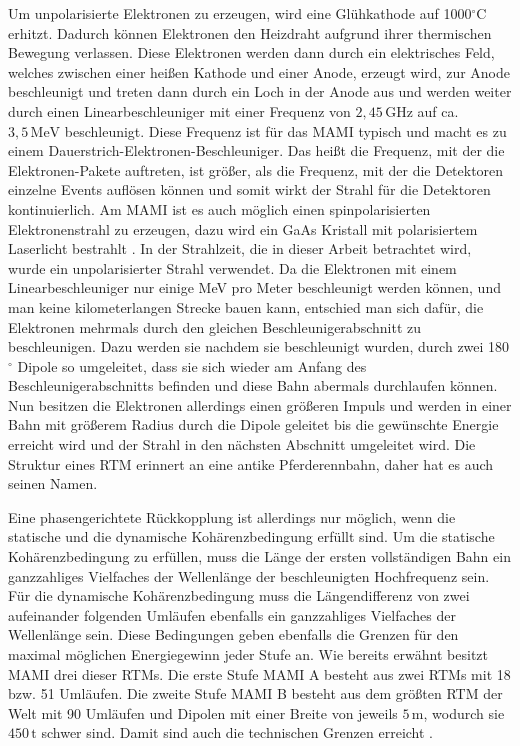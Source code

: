 \documentclass[a4paper,11pt,oneside,final,german,openbib,pdftex]{scrbook}
\begin{document}
{Um unpolarisierte Elektronen zu erzeugen, wird eine Glühkathode auf 1000$^{\circ}$C erhitzt. Dadurch können Elektronen den Heizdraht aufgrund ihrer thermischen Bewegung verlassen. Diese Elektronen werden dann durch ein elektrisches Feld, welches zwischen einer heißen Kathode und einer Anode, erzeugt wird, zur Anode beschleunigt und treten dann durch ein Loch in der Anode aus und werden weiter durch einen Linearbeschleuniger mit einer Frequenz von $2,45\, \text{GHz}$ auf ca. $3,5\, \text{MeV}$ beschleunigt. Diese Frequenz ist für das MAMI typisch und macht es zu einem Dauerstrich-Elektronen-Beschleuniger. Das heißt die Frequenz, mit der die Elektronen-Pakete auftreten, ist größer, als die Frequenz, mit der die Detektoren einzelne Events auflösen können und somit wirkt der Strahl für die Detektoren kontinuierlich.
Am MAMI ist es auch m\"oglich einen spinpolarisierten Elektronenstrahl zu erzeugen, dazu wird ein GaAs Kristall mit polarisiertem Laserlicht bestrahlt \cite{Un08}. 
In der Strahlzeit, die in dieser Arbeit betrachtet wird, wurde ein unpolarisierter Strahl verwendet.
\newline
Da die Elektronen mit einem Linearbeschleuniger nur einige MeV pro Meter beschleunigt werden k\"onnen, und man keine kilometerlangen Strecke bauen kann, entschied man sich daf\"ur, die Elektronen mehrmals durch den gleichen Beschleunigerabschnitt zu beschleunigen. Dazu werden sie nachdem sie beschleunigt wurden, durch zwei 180$^{\circ}$ Dipole so umgeleitet, dass sie sich wieder am Anfang des Beschleunigerabschnitts befinden und diese Bahn abermals durchlaufen können. Nun besitzen die Elektronen allerdings einen gr\"o{\ss}eren Impuls und werden in einer Bahn mit gr\"o{\ss}erem Radius durch die Dipole geleitet bis die gew\"unschte Energie erreicht wird und der Strahl in den n\"achsten Abschnitt umgeleitet wird. Die Struktur eines RTM erinnert an eine antike Pferderennbahn, daher hat es auch seinen Namen.

 Eine phasengerichtete R\"uckkopplung ist allerdings nur m\"oglich, wenn die statische und die dynamische Koh\"arenzbedingung erf\"ullt sind. Um die statische Koh\"arenzbedingung zu erf\"ullen, muss die L\"ange der ersten vollst\"andigen Bahn ein ganzzahliges Vielfaches der Wellenl\"ange der beschleunigten Hochfrequenz sein. F\"ur die dynamische Koh\"arenzbedingung muss die L\"angendifferenz von zwei aufeinander folgenden Uml\"aufen ebenfalls ein ganzzahliges Vielfaches der Wellenl\"ange sein\cite{Un08}. 
  Diese Bedingungen geben ebenfalls die Grenzen f\"ur den maximal m\"oglichen Energiegewinn jeder Stufe an. 
\newline
Wie bereits erw\"ahnt besitzt MAMI drei dieser RTMs. Die erste Stufe MAMI A besteht aus zwei RTMs mit 18 bzw. 51 Uml\"aufen. Die zweite Stufe MAMI B besteht aus dem gr\"o{\ss}ten RTM der Welt mit 90 Uml\"aufen und Dipolen mit einer Breite von jeweils $5\, \text{m}$, wodurch sie $450\, \text{t}$ schwer sind. Damit sind auch die technischen Grenzen erreicht \cite{KPh11F}.


}
\end{document}
